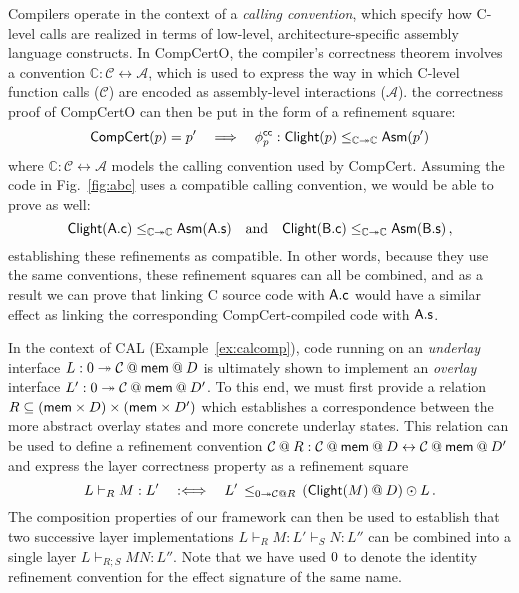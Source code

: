 \begin{example} %
\label{ex:bq-proof}
Compilers operate in the context of a \emph{calling convention},
which specify how C-level calls are realized
in terms of low-level, architecture-specific assembly language constructs.
In CompCertO,
the compiler's correctness theorem involves
a convention
$\mathbb{C} : \mathcal{C} \leftrightarrow \mathcal{A}$,
which is used to express the way in which
C-level function calls ($\mathcal{C}$) are encoded
as assembly-level interactions ($\mathcal{A}$).
the correctness proof of CompCertO
can then be put in the form of a refinement square:
\[
   \mathsf{CompCert} (p) = p'
  \quad \Longrightarrow \quad
    \phi^{ \mathsf{cc} }_p :
       \mathsf{Clight} (p) \le_{\mathbb{C} \twoheadrightarrow \mathbb{C}}  \mathsf{Asm} (p')
\]
where %
$\mathbb{C} : \mathcal{C} \leftrightarrow \mathcal{A}$
models the calling convention used by CompCert.
Assuming the code in Fig.~\ref{fig:abc} uses a compatible calling convention,
we would be able to prove as well:
\[
   \mathsf{Clight} ( \mathsf{A.c} ) \le_{\mathbb{C} \twoheadrightarrow \mathbb{C}}  \mathsf{Asm} ( \mathsf{A.s} )
  \quad \text{and} \quad
   \mathsf{Clight} ( \mathsf{B.c} ) \le_{\mathbb{C} \twoheadrightarrow \mathbb{C}}  \mathsf{Asm} ( \mathsf{B.s} )
  \,,
\]
establishing these refinements as compatible.
In other words,
because they use the same conventions,
these refinement squares can all be combined,
and as a result we can prove that
linking C source code with $ \mathsf{A.c} $
would have a similar effect as linking the corresponding CompCert-compiled code with $ \mathsf{A.s} $.
\end{example}

\begin{example} %
In the context of CAL (Example~\ref{ex:calcomp}),
code running on an \emph{underlay} interface
$L : \emptysig \twoheadrightarrow \mathcal{C} \mathbin@ \kw{mem} \mathbin@ D$
is ultimately shown to implement an \emph{overlay} interface
$L' : \emptysig \twoheadrightarrow \mathcal{C} \mathbin@ \kw{mem} \mathbin@ D'$.
To this end, we must first provide a relation
$R \subseteq ( \mathsf{mem}  \times D) \times ( \mathsf{mem}  \times D')$
which establishes a correspondence between
the more abstract overlay states and more concrete underlay states.
This relation can be used to define a refinement convention
$\mathcal{C} \mathbin@ R : \mathcal{C} \mathbin@ \kw{mem} \mathbin@ D
 \leftrightarrow \mathcal{C} \mathbin@ \kw{mem} \mathbin@ D'$
and express the layer correctness property as a refinement square
\[
  L \vdash_R M : L' \quad :\Longleftrightarrow \quad
  L' \, \le_{\emptysig \twoheadrightarrow \mathcal{C} \mathbin@ R} \,
    (\kw{Clight}(M) \mathbin@ D) \odot L
  \,.
\]
The composition properties of our framework can then be used to establish that
two successive layer implementations
$L \vdash_R M : L' \vdash_S N : L''$ can be combined into a single layer
$L \vdash_{R \mathbin; S} M N : L''$.
Note that we have used $0$ to denote the identity refinement convention
for the effect signature of the same name. 
\end{example}

